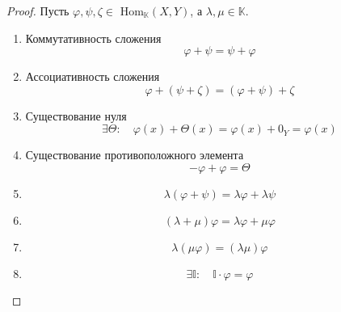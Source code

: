 \documentclass{article}
\newcommand*{\Hom}[2]{Hom$_\mathbb{K}(#1, #2)$}
\begin{document}
\begin{proof}
    Пусть $\varphi, \psi, \zeta \in$ \Hom X Y, а $\lambda, \mu \in \mathbb{K}$.
    \begin{enumerate}
        \item Коммутативность сложения
        $$
            \varphi + \psi = \psi + \varphi 
        $$ 
        \item Ассоциативность сложения 
        $$
            \varphi + (\psi + \zeta) = (\varphi + \psi) + \zeta
        $$
        \item Существование нуля
        $$
            \exists \varTheta: \quad \varphi(x) + \varTheta(x) = \varphi(x) + 0_Y = \varphi(x)
        $$
        \item Существование противоположного элемента
        $$
            -\varphi + \varphi = \varTheta
        $$
        \item 
        $$
            \lambda(\varphi + \psi) = \lambda\varphi + \lambda\psi
        $$
        \item 
        $$
            (\lambda + \mu) \varphi = \lambda\varphi + \mu \varphi
        $$
        \item 
        $$
            \lambda(\mu\varphi) = (\lambda\mu)\varphi
        $$
        \item 
        $$
            \exists \mathbb I: \quad \mathbb I \cdot \varphi = \varphi
        $$
    \end{enumerate}
\end{proof}
\end{document}
